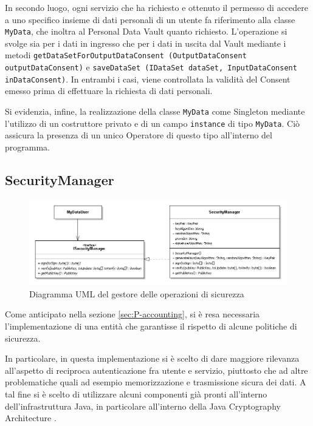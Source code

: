In secondo luogo, ogni servizio che ha richiesto e ottenuto il permesso di accedere a uno specifico insieme di dati personali di un utente fa riferimento alla classe \texttt{MyData}, che inoltra al Personal Data Vault quanto richiesto. L’operazione si svolge sia per i dati in ingresso che per i dati in uscita dal Vault mediante i metodi \texttt{getDataSetForOutputDataConsent (OutputDataConsent outputDataConsent)} e \texttt{saveDataSet (IDataSet dataSet, InputDataConsent inDataConsent)}. In entrambi i casi, viene controllata la validit\`a del Consent emesso prima di effettuare la richiesta di dati personali.

Si evidenzia, infine, la realizzazione della classe \texttt{MyData} come Singleton mediante l’utilizzo di un costruttore privato e di un campo \texttt{instance} di tipo \texttt{MyData}. Ci\`o assicura la presenza di un unico Operatore di questo tipo all’interno del programma.

\subsection{SecurityManager}
\label{subsec:P-SecMan}
\begin{figure} [h]
	\includegraphics[width=\linewidth]{pictures/Accounting-SecurityManager.png}
	\caption{Diagramma UML del gestore delle operazioni di sicurezza}
	\label{fig:Accounting-SecurityManager}
\end{figure}
Come anticipato nella sezione \ref{sec:P-accounting}, si \`e resa necessaria l'implementazione di una entit\`a che garantisse il rispetto di alcune politiche di sicurezza.

In particolare, in questa implementazione si \`e scelto di dare maggiore rilevanza all'aspetto di reciproca autenticazione fra utente e servizio, piuttosto che ad altre problematiche quali ad esempio memorizzazione e trasmissione sicura dei dati. A tal fine si \`e scelto di utilizzare alcuni componenti gi\`a pronti all'interno dell'infrastruttura Java, in particolare all'interno della Java Cryptography Architecture \cite{javacrypto}.

